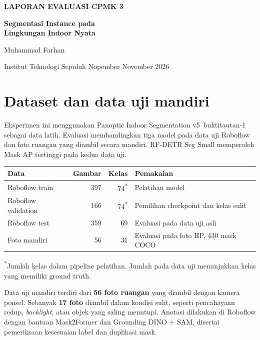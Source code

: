 \documentclass[10pt,a4paper]{article}
\newcommand{\buktiref}[1]{\csname buktitautan-#1\endcsname{[#1]}}
\begin{document}

{\small\bfseries LAPORAN EVALUASI CPMK 3}\par
{\huge\bfseries Segmentasi Instance pada\\Lingkungan Indoor Nyata\par}
\vspace{3pt}
{\large Muhammad Farhan \quad \textbar {}}\par
{\small Institut Teknologi Sepuluh Nopember \quad \textbar {} November 2026}\par

\section{Dataset dan data uji mandiri}

Eksperimen ini menggunakan Panoptic Indoor Segmentation v5~\buktiref{1} sebagai data latih. Evaluasi membandingkan tiga model pada data uji Roboflow dan foto ruangan yang diambil secara mandiri. RF-DETR Seg Small memperoleh Mask AP tertinggi pada kedua data uji.

\begin{tabularx}{\linewidth}{@{}YrrY@{}}
\toprule
\textbf{Data} & \textbf{Gambar} & \textbf{Kelas} & \textbf{Pemakaian} \\
\midrule
Roboflow train & 397 & 74\textsuperscript{*} & Pelatihan model \\
Roboflow validation & 166 & 74\textsuperscript{*} & Pemilihan checkpoint dan kelas sulit \\
Roboflow test & 359 & 69 & Evaluasi pada data uji asli \\
Foto mandiri & 56 & 31 & Evaluasi pada foto HP, 430 mask COCO \\
\bottomrule
\end{tabularx}

{\footnotesize \textsuperscript{*}Jumlah kelas dalam pipeline pelatihan. Jumlah pada data uji menunjukkan kelas yang memiliki ground truth.}\par
Data uji mandiri terdiri dari \textbf{56 foto ruangan} yang diambil dengan kamera ponsel. Sebanyak \textbf{17 foto} diambil dalam kondisi sulit, seperti pencahayaan redup, \textit{backlight}, atau objek yang saling menutupi. Anotasi dilakukan di Roboflow dengan bantuan Mask2Former dan Grounding DINO + SAM, disertai pemeriksaan kesesuaian label dan duplikasi mask.
\end{document}
